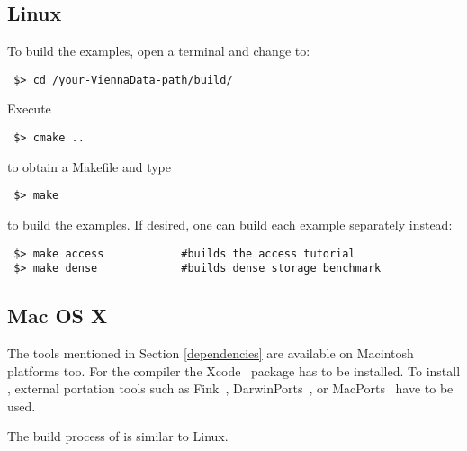 \subsection{Linux}
To build the examples, open a terminal and change to:

\begin{lstlisting}
 $> cd /your-ViennaData-path/build/
\end{lstlisting}
Execute
\begin{lstlisting}
 $> cmake ..
\end{lstlisting}
to obtain a Makefile and type
\begin{lstlisting}
 $> make 
\end{lstlisting}
to build the examples. If desired, one can build each example separately instead:
\begin{lstlisting}
 $> make access            #builds the access tutorial
 $> make dense             #builds dense storage benchmark
\end{lstlisting}


\subsection{Mac OS X}
\label{apple}
The tools mentioned in Section \ref{dependencies} are available on 
Macintosh platforms too. 
For the {\GCC} compiler the Xcode~\cite{xcode} package has to be installed.
To install {\CMake}, external portation tools such as
Fink~\cite{fink}, DarwinPorts~\cite{darwinports}, 
or MacPorts~\cite{macports} have to be used. 

The build process of {\ViennaData} is similar to Linux.

